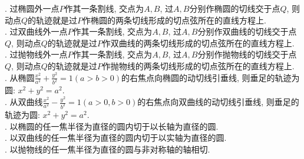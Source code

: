 \documentclass[10pt,column,letterpaper]{article}
\title{}
\author{}
\theoremstyle{mythmstyle}
\begin{document}
\large
{}. 过椭圆外一点$P$作其一条割线, 交点为$A,B$, 过$A,B$分别作椭圆的切线交于点$Q$, 则动点$Q$的轨迹就是过$P$作椭圆的两条切线形成的切点弦所在的直线方程上.\\

. 过双曲线外一点$P$作其一条割线, 交点为$A,B$, 过$A,B$分别作双曲线的切线交于点$Q$, 则动点$Q$的轨迹就是过$P$作双曲线的两条切线形成的切点弦所在的直线方程上.\\

. 过抛物线外一点$P$作其一条割线, 交点为$A,B$, 过$A,B$分别作抛物线的切线交于点$Q$, 则动点$Q$的轨迹就是过$P$作抛物线的两条切线形成的切点弦所在的直线方程上.\\

. 从椭圆$\frac{x^2}{a^2}+\frac{y^2}{b^2}=1(a>b>0)$的右焦点向椭圆的动切线引垂线, 则垂足的轨迹为圆: $x^2 + y^2 = a^2$.\\

. 从双曲线$\frac{x^2}{a^2}-\frac{y^2}{b^2}=1(a>0,b>0)$的右焦点向双曲线的动切线引垂线, 则垂足的轨迹为圆: $x^2 + y^2 = a^2$.\\

. 以椭圆的任一焦半径为直径的圆内切于以长轴为直径的圆.\\ 

. 以双曲线的任一焦半径为直径的圆内切于以实轴为直径的圆.\\

. 以抛物线的任一焦半径为直径的圆与非对称轴的轴相切.\\
\end{document}
